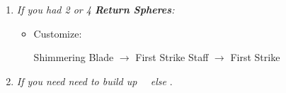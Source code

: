\begin{spheregrid}
\begin{multicols}{2}
\begin{itemize}
		\end{itemize}
	\end{multicols}
\end{spheregrid}
\begin{multicols}{2}
\begin{enumerate}[resume]
	\item \textit{If you had 2 or 4 \textbf{Return Spheres}:}
	      \begin{itemize}
		      \item Customize:
		            \begin{itemize}
			            \auronf Shimmering Blade $\rightarrow$ First Strike
			            \yunaf Staff $\rightarrow$ First Strike
		            \end{itemize}
	      \end{itemize}
	      \bothvfill
	      \winvfill
	      \lossvfill
	\item \formation{\tidus}{\rikku}{\auron} \textit{If you need need to build up \rikku\ \od\ else } \formation{\tidus}{\kimahri}{\wakka}.
\end{enumerate}


\end{multicols}
